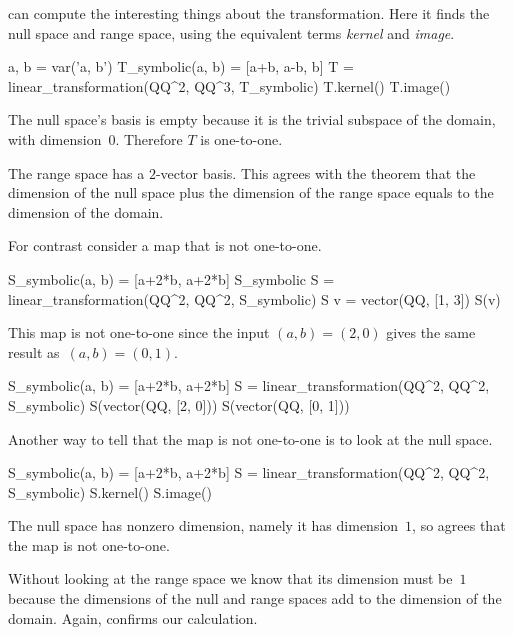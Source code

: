 \Sage{} can compute the interesting things about the transformation.
Here it finds the null space 
and range space, using the equivalent 
terms \textit{kernel} and \textit{image}.
\begin{sageoutput}[d,0,3]
a, b = var('a, b')   
T_symbolic(a, b) = [a+b, a-b, b]         
T = linear_transformation(QQ^2, QQ^3, T_symbolic)
T.kernel()                                       
T.image()                                        
\end{sageoutput}
The null space's basis is empty because 
it is the trivial subspace of the domain,
with dimension~$0$.
Therefore $T$ is one-to-one.

The range space has a $2$-vector basis. 
This agrees with the theorem that
the dimension of the null space plus the dimension of the 
range space equals to the dimension of the domain.

For contrast consider a map that is not one-to-one.
\begin{sageoutput}
S_symbolic(a, b) = [a+2*b, a+2*b]
S_symbolic
S = linear_transformation(QQ^2, QQ^2, S_symbolic)
S
v = vector(QQ, [1, 3])  
S(v)
\end{sageoutput}
\noindent This map is not one-to-one since the input $(a,b)=(2,0)$  gives
the same result as~$(a,b)=(0,1)$.  
\begin{sageoutput}[d,0,2]
S_symbolic(a, b) = [a+2*b, a+2*b]
S = linear_transformation(QQ^2, QQ^2, S_symbolic)
S(vector(QQ, [2, 0]))
S(vector(QQ, [0, 1]))
\end{sageoutput}
\noindent
Another way to tell that the map is not one-to-one is to look at the 
null space.
\begin{sageoutput}[d,0,2]
S_symbolic(a, b) = [a+2*b, a+2*b]
S = linear_transformation(QQ^2, QQ^2, S_symbolic)
S.kernel()
S.image()
\end{sageoutput}
The null space has nonzero dimension, namely it 
has dimension~$1$,
so \Sage{} agrees that the map is not one-to-one.

Without looking at the range space we know that its dimension must be~$1$ 
because the dimensions of the null and range spaces add to
the dimension of the domain.
Again, \Sage{} confirms our calculation.



